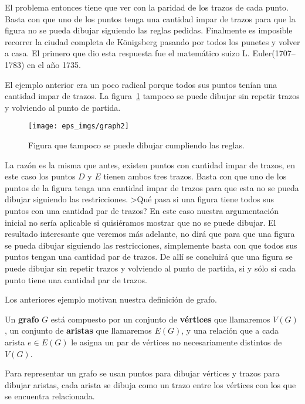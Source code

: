 \begin{ejemplo}
El problema entonces tiene que ver con la paridad de los trazos de cada punto.
Basta con que uno de los puntos tenga una cantidad impar de trazos para que la figura no se pueda dibujar siguiendo las reglas pedidas.
Finalmente es imposible recorrer la ciudad completa de K\"onigsberg pasando por todos los punetes y volver a casa.
El primero que dio esta respuesta fue el matemático suizo L. Euler(1707--1783) en el año 1735.
\end{ejemplo}

\begin{ejemplo}
El ejemplo anterior era un poco radical porque todos sus puntos tenían una cantidad impar de trazos.
La figura~\ref{fig:graph2} tampoco se puede dibujar sin repetir trazos y volviendo al punto de partida.

\begin{figure}[h!]
\centering
\texttt{[image: eps\_imgs/graph2]}
\caption{Figura que tampoco se puede dibujar cumpliendo las reglas.}
\label{fig:graph2}
\end{figure}

La razón es la misma que antes, existen puntos con cantidad impar de trazos, en este caso los puntos $D$ y $E$ tienen ambos tres trazos.
Basta con que uno de los puntos de la figura tenga una cantidad impar de trazos para que esta no se pueda dibujar siguiendo las restricciones.
>Qué pasa si una figura tiene todos sus puntos con una cantidad par de trazos?
En este caso nuestra argumentación inicial no sería aplicable si quisiéramos mostrar que no se puede dibujar.
El resultado interesante que veremos más adelante, no dirá que para que una figura se pueda dibujar siguiendo las restricciones, simplemente basta con que todos sus puntos tengan una cantidad par de trazos.
De allí se concluirá que una figura se puede dibujar sin repetir trazos y volviendo al punto de partida, si y sólo si cada punto tiene una cantidad par de trazos.
\end{ejemplo}

Los anteriores ejemplo motivan nuestra definición de grafo.

\begin{definicion}
Un {\bf grafo} $G$ está compuesto por un conjunto de {\bf vértices} que llamaremos $V(G)$, un conjunto de {\bf aristas} que llamaremos $E(G)$, y una relación que a cada arista $e\in E(G)$ le asigna un par de vértices no necesariamente distintos de $V(G)$.

Para representar un grafo se usan puntos para dibujar vértices y trazos para dibujar aristas, cada arista se dibuja como un trazo entre los vértices con los que se encuentra relacionada.
\end{definicion}

